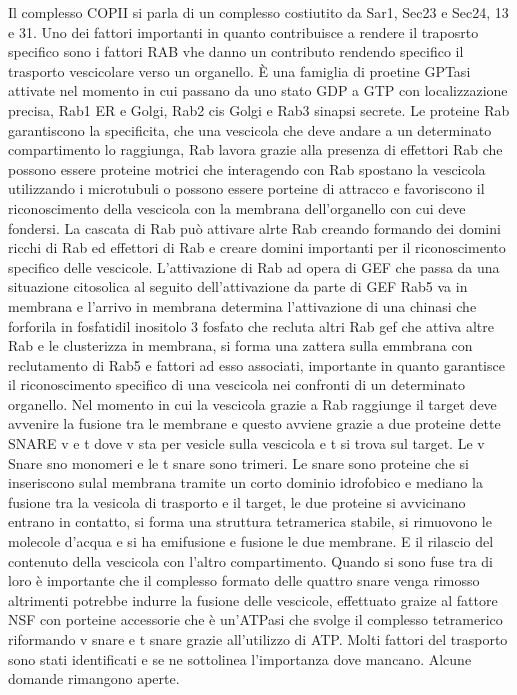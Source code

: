 Il complesso COPII si parla di un complesso costiutito da Sar1, Sec23 e Sec24, 13 e 31. Uno dei fattori importanti in quanto contribuisce a rendere il traposrto specifico sono i 
fattori RAB vhe danno un contributo rendendo specifico il trasporto vescicolare verso un organello. \`E una famiglia di proetine GPTasi attivate nel momento in cui passano da uno 
stato GDP a GTP con localizzazione precisa, Rab1 ER e Golgi, Rab2 cis Golgi e Rab3 sinapsi secrete. Le proteine Rab  garantiscono la specificita, che una vescicola che deve andare a
un determinato compartimento lo raggiunga, Rab lavora grazie alla presenza di effettori Rab che possono essere proteine motrici che interagendo con Rab spostano la vescicola 
utilizzando i microtubuli o possono essere porteine di attracco e favoriscono il riconoscimento della vescicola con la membrana dell'organello con cui deve fondersi. La cascata di Rab
pu\`o attivare alrte Rab creando formando dei domini ricchi di Rab ed effettori di Rab e creare domini importanti per il riconoscimento specifico delle vescicole. L'attivazione di Rab
ad opera di GEF che passa da una situazione citosolica al seguito dell'attivazione da parte di GEF Rab5 va in membrana e l'arrivo in membrana determina l'attivazione di una chinasi
che forforila in fosfatidil inositolo 3 fosfato che recluta altri Rab gef che attiva altre Rab e le clusterizza in membrana, si forma una zattera sulla emmbrana con reclutamento di Rab5
e fattori ad esso associati, importante in quanto garantisce il riconoscimento specifico di una vescicola nei confronti di un determinato organello. Nel momento in cui la vescicola grazie
a Rab raggiunge il target deve avvenire la fusione tra le membrane e questo avviene grazie a due proteine dette SNARE v e t dove v sta per vesicle sulla vescicola e t si trova sul 
target. Le v Snare sno monomeri e le t snare sono trimeri. Le snare sono proteine che si inseriscono sulal membrana tramite un corto dominio idrofobico e mediano la fusione tra la 
vesicola di trasporto e il target, le due proteine si avvicinano entrano in contatto, si forma una struttura tetramerica stabile, si rimuovono le molecole d'acqua e si ha emifusione e 
fusione le due membrane. E il rilascio del contenuto della vescicola con l'altro compartimento. Quando si sono fuse tra di loro \`e importante che il complesso formato delle quattro snare
venga rimosso altrimenti potrebbe indurre la fusione delle vescicole, effettuato graize al fattore NSF con porteine accessorie che \`e un'ATPasi che svolge il complesso tetramerico 
riformando v snare e t snare grazie all'utilizzo di ATP. Molti fattori del trasporto sono stati identificati e se ne sottolinea l'importanza dove mancano. Alcune domande rimangono aperte.
